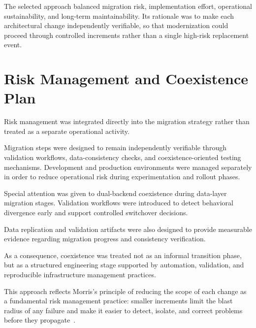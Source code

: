 The selected approach balanced migration risk, implementation effort, operational sustainability, and long-term maintainability. Its rationale was to make each architectural change independently verifiable, so that modernization could proceed through controlled increments rather than a single high-risk replacement event.

\clearpage
\section{Risk Management and Coexistence Plan}
Risk management was integrated directly into the migration strategy rather than treated as a separate operational activity.

Migration steps were designed to remain independently verifiable through validation workflows, data-consistency checks, and coexistence-oriented testing mechanisms. Development and production environments were managed separately in order to reduce operational risk during experimentation and rollout phases.

Special attention was given to dual-backend coexistence during data-layer migration stages. Validation workflows were introduced to detect behavioral divergence early and support controlled switchover decisions.

Data replication and validation artifacts were also designed to provide measurable evidence regarding migration progress and consistency verification.

As a consequence, coexistence was treated not as an informal transition phase, but as a structured engineering stage supported by automation, validation, and reproducible infrastructure management practices.

This approach reflects Morris's principle of reducing the scope of each change as a fundamental risk management practice: smaller increments limit the blast radius of any failure and make it easier to detect, isolate, and correct problems before they propagate~\cite{morris2021iac}.
